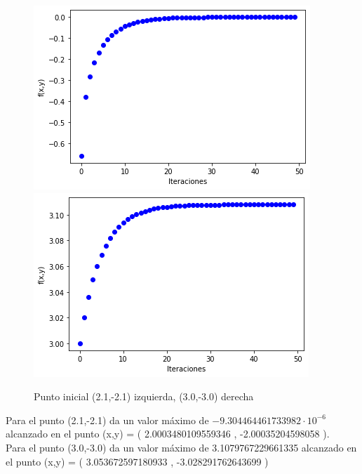 \documentclass[12pt]{article}
\begin{document}
\begin{figure}[H]
\centering
\includegraphics[scale=0.45]{Images/MN21.png} 
\includegraphics[scale=0.45]{Images/MN3.png} 
\caption{Punto inicial (2.1,-2.1) izquierda, (3.0,-3.0) derecha}
\label{etiqueta}
\end{figure}
Para el punto (2.1,-2.1) da un valor máximo de $-9.304464461733982\cdot 10^{-6}$ alcanzado en el punto (x,y) = ( 2.0003480109559346 ,  -2.00035204598058 ). \\
Para el punto (3.0,-3.0) da un valor máximo de 3.1079767229661335 alcanzado en el punto (x,y) = ( 3.053672597180933 ,  -3.028291762643699 ) \\
\end{document}
